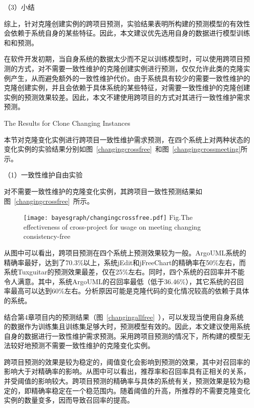 （3）小结

综上，针对克隆创建实例的跨项目预测，实验结果表明所构建的预测模型的有效性会依赖于系统自身的某些特征。因此，本文建议优先选用自身的数据进行模型训练和和预测。

在软件开发初期，当自身系统的数据太少而不足以训练模型时，可以使用跨项目预测的方式，对不需要一致性维护的克隆创建实例进行预测，仅仅允许此类的克隆实例产生，从而避免额外的一致性维护代价。由于系统具有较少的需要一致性维护的克隆创建实例，并且会依赖于具体系统的某些特征，对需要一致性维护的克隆创建实例的预测效果较差。因此，本文不建使用跨项目的方式对其进行一致性维护需求预测。

{The Results for Clone Changing Instances}

本节对克隆变化实例进行跨项目一致性维护需求预测，在四个系统上对两种状态的变化实例的实验结果分别如图~\ref{changingcrossfree}~和图~\ref{changingcrossmeeting}所示。

（1）一致性维护自由实验

对不需要一致性维护的克隆变化实例，其跨项目一致性预测结果如图~\ref{changingcrossfree}~所示。

\begin{figure}[h]
\centering
\texttt{[image: bayesgraph/changingcrossfree.pdf]}
{Fig.$\!$}{The effectiveness of cross-project for usage on meeting changing consistency-free}
\vspace{-1em}
\end{figure}

从图中可以看出，跨项目预测在四个系统上预测效果较为一般。ArgoUML系统的精确率最好，达到了70.3\%以上，系统jEdit和jFreeChart的精确率在50\%左右，而系统Tuxguitar的预测效果最差，仅在25\%左右。同时，四个系统的召回率并不能令人满意。其中，系统ArgoUML的召回率最低（低于36.46\%），其它系统的召回率最高可以达到60\%左右。分析原因可能是克隆代码的变化情况较高的依赖于具体的系统。

结合第4章项目内的预测结果（图~\ref{changingallfree}~），可以发现当使用自身系统的数据作为训练集且训练集足够大时，预测模型有效的。因此，本文建议使用系统自身的数据进行一致性维护需求预测。采用跨项目预测的情况下，所构建的模型无法较好地预测不需要一致性维护的克隆变化实例。

跨项目预测的效果是较为稳定的，阈值变化会影响到预测的效果，其中对召回率的影响大于对精确率的影响。从图中可以看出，推荐率和召回率具有正相关的关系，并受阈值的影响较大。跨项目预测的精确率与具体的系统有关，预测效果是较为稳定的，即精确率稳定在一个稳范围内。随着阈值的升高，所推荐的不需要克隆变化实例的数量变多，因而导致召回率的提高。

